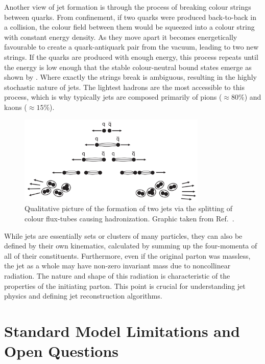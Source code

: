 Another view of jet formation is through the process of breaking colour strings between quarks.
From confinement, if two quarks were produced back-to-back in a collision, the colour field between them would be squeezed into a colour string with constant energy density.
As they move apart it becomes energetically favourable to create a quark-antiquark pair from the vacuum, leading to two new strings.
If the quarks are produced with enough energy, this process repeats until the energy is low enough that the stable colour-neutral bound states emerge as shown by .
Where exactly the strings break is ambiguous, resulting in the highly stochastic nature of jets.
The lightest hadrons are the most accessible to this process, which is why typically jets are composed primarily of pions ($\approx80\%$) and kaons ($\approx15\%$).

\begin{figure}[h]
    \centering
    \includegraphics[width=0.8\textwidth]{Figures/standard_model/hadronisation.png}
    \caption{Qualitative picture of the formation of two jets via the splitting of colour flux-tubes causing hadronization. Graphic taken from Ref.~\cite{ModernParticlePhysics}.}
    \label{fig:hadronization}
\end{figure}

While jets are essentially sets or clusters of many particles, they can also be defined by their own kinematics, calculated by summing up the four-momenta of all of their constituents.
Furthermore, even if the original parton was massless, the jet as a whole may have non-zero invariant mass due to noncollinear radiation.
The nature and shape of this radiation is characteristic of the properties of the initiating parton.
This point is crucial for understanding jet physics and defining jet reconstruction algorithms.

\section{Standard Model Limitations and Open Questions}
\label{sec:sm_limitations}


